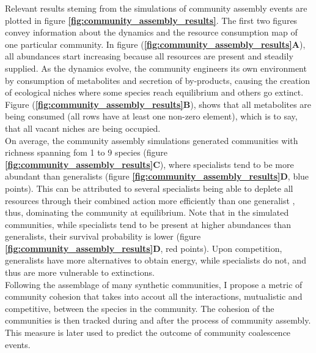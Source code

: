 \documentclass[titlepage,11pt]{article}
\begin{document}
\begin{linenumbers}
\begin{singlespace}
				Relevant results steming from the simulations of community assembly events are plotted in figure \textbf{\ref{fig:community_assembly_results}}. The first two figures convey information about the dynamics  and the resource consumption map of one particular community. In figure (\textbf{\ref{fig:community_assembly_results}A}), all abundances start increasing because all resources are present and steadily supplied. As the dynamics evolve, the community engineers its own environment by consumption of metabolites and secretion of by-products, causing the creation of ecological niches where some species reach equilibrium and others go extinct. Figure (\textbf{\ref{fig:community_assembly_results}B}), shows that all metabolites are being consumed (all rows have at least one non-zero element), which is to say, that all vacant niches are being occupied.\\
				On average, the community assembly simulations generated communities with richness spanning fom 1 to 9 species (figure \textbf{\ref{fig:community_assembly_results}C}), where specialists tend to be more abundant than generalists (figure \textbf{\ref{fig:community_assembly_results}D}, blue points). This can be attributed to several specialists being able to deplete all resources through their combined action more efficiently than one generalist \citep{Pascual-Garcia2020}, thus, dominating the community at equilibrium. Note that in the simulated communities, while specialists tend to be present at higher abundances than generalists, their survival probability is lower (figure \textbf{\ref{fig:community_assembly_results}D}, red points). Upon competition, generalists have more alternatives to obtain energy, while specialists do not, and thus are more vulnerable to extinctions.\\

				Following the assemblage of many synthetic communities, I propose a metric of community cohesion that takes into accout all the interactions, mutualistic and competitive, between the species in the community. The cohesion of the communities is then tracked during and after the process of community assembly. This measure is later used to predict the outcome of community coalescence events.

\end{singlespace}
\end{linenumbers}
\end{document}
